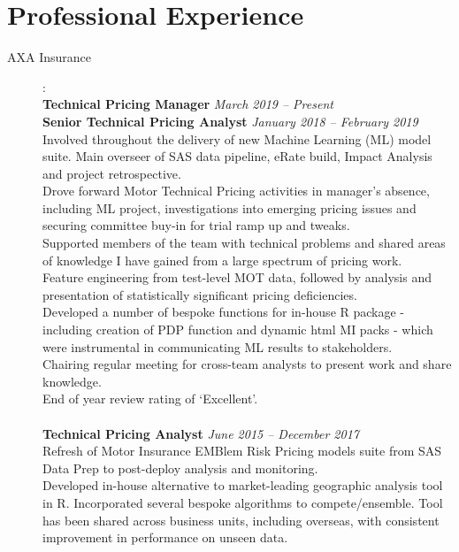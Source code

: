 \documentclass[11pt]{article}
\begin{document}
\section*{Professional Experience}
\begin{description}

\item[AXA Insurance]: \\
\textbf{Technical Pricing Manager} \emph{March 2019 -- Present}\\
\textbf{Senior Technical Pricing Analyst} \emph{January 2018 -- February 2019}\\
\textbullet \quad Involved throughout the delivery of new Machine Learning (ML) model suite. Main overseer of SAS data pipeline, eRate build, Impact Analysis and project retrospective. \\
\textbullet \quad Drove forward Motor Technical Pricing activities in manager's absence, including ML project, investigations into emerging pricing issues and securing committee buy-in for trial ramp up and tweaks. \\
\textbullet \quad Supported members of the team with technical problems and shared areas of knowledge I have gained from a large spectrum of pricing work. \\
\textbullet \quad Feature engineering from test-level MOT data, followed by analysis and presentation of statistically significant pricing deficiencies. \\
\textbullet \quad Developed a number of bespoke functions for in-house R package - including creation of PDP function and dynamic html MI packs - which were instrumental in communicating ML results to stakeholders. \\
\textbullet \quad Chairing regular meeting for cross-team analysts to present work and share knowledge. \\
\textbullet \quad End of year review rating of `Excellent'.
\\\\
\textbf{Technical Pricing Analyst} \emph{June 2015 -- December 2017}\\
\textbullet \quad Refresh of Motor Insurance EMBlem Risk Pricing models suite from SAS Data Prep to post-deploy analysis and monitoring. \\
\textbullet \quad Developed in-house alternative to market-leading geographic analysis tool in R. Incorporated several bespoke algorithms to compete/ensemble. Tool has been shared across business units, including overseas, with consistent improvement in performance on unseen data. \\

\end{description}
\end{document}
